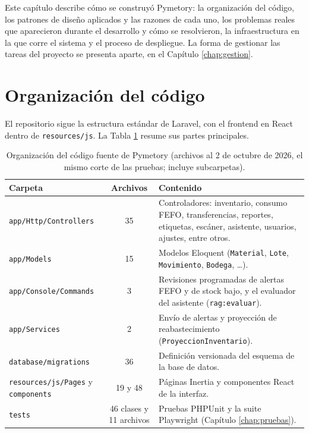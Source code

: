 
Este capítulo describe cómo se construyó Pymetory: la organización del código, los patrones de diseño aplicados y las razones de cada uno, los problemas reales que aparecieron durante el desarrollo y cómo se resolvieron, la infraestructura en la que corre el sistema y el proceso de despliegue. La forma de gestionar las tareas del proyecto se presenta aparte, en el Capítulo \ref{chap:gestion}.

\section{Organización del código}
\label{sec:imp_organizacion}

El repositorio sigue la estructura estándar de Laravel, con el frontend en React dentro de \texttt{resources/js}. La Tabla \ref{tab:imp_organizacion} resume sus partes principales.

\begin{table}[!htbp]
\centering
\caption[Organización del código fuente de Pymetory.]{Organización del código fuente de Pymetory (archivos al 2 de octubre de 2026, el mismo corte de las pruebas; incluye subcarpetas).}
\label{tab:imp_organizacion}
\begin{tabular}{|p{4.4cm}|c|p{8cm}|}
\hline
\textbf{Carpeta} & \textbf{Archivos} & \textbf{Contenido} \\
\hline
\texttt{app/Http/Controllers} & 35 & Controladores: inventario, consumo FEFO, transferencias, reportes, etiquetas, escáner, asistente, usuarios, ajustes, entre otros. \\ \hline
\texttt{app/Models} & 15 & Modelos Eloquent (\texttt{Material}, \texttt{Lote}, \texttt{Movimiento}, \texttt{Bodega}, \ldots). \\ \hline
\texttt{app/Console/Commands} & 3 & Revisiones programadas de alertas FEFO y de stock bajo, y el evaluador del asistente (\texttt{rag:evaluar}). \\ \hline
\texttt{app/Services} & 2 & Envío de alertas y proyección de reabastecimiento (\texttt{ProyeccionInventario}). \\ \hline
\texttt{database/migrations} & 36 & Definición versionada del esquema de la base de datos. \\ \hline
\texttt{resources/js/Pages} y \texttt{components} & 19 y 48 & Páginas Inertia y componentes React de la interfaz. \\ \hline
\texttt{tests} & 46 clases y 11 archivos & Pruebas PHPUnit y la suite Playwright (Capítulo \ref{chap:pruebas}). \\ \hline
\end{tabular}
\end{table}

